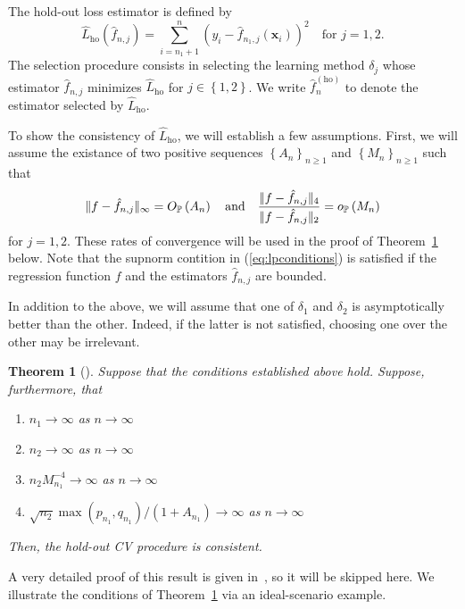 \documentclass[11pt, letter paper]{article}
\newcommand{\1}{\mathmybb{1}}
\newtheorem{theorem}[proposition]{Theorem}
\newcommand{\0}{\emptyset}
\newcommand{\prob}{\mathbb{P}}
\newcommand{\paren}[1]{\left(#1 \right)}
\newcommand{\set}[1]{\left\{ #1 \right\}}
\newcommand{\norm}[1]{|\hspace{-1pt}|#1 |\hspace{-1pt}|}
\newcommand{\x}{\boldsymbol{x}}
\newcommand{\ho}{\hat{L}_{\mathrm{ho}}}
\newcommand{\op}[1]{o_{\prob}\paren{#1}}
\newcommand{\Op}[1]{O_{\prob}\paren{#1}}
\newcommand{\fhat}[2]{\hat{f}_{#1, #2}}
\newcommand{\fho}{\hat{f}^{(\mathrm{ho})}_{n}}
\begin{document}
The hold-out loss estimator is defined by
\begin{equation}\label{def:holoss}
    \ho(\fhat{n}{j}) = \sum_{i=n_{1}+1}^{n}\paren{y_{i} - \fhat{n_{1}}{j}(\x_{i})}^{2}\quad\text{for }j=1,2.
\end{equation}
The selection procedure consists in selecting the learning method \(\delta_{j}\) whose estimator \(\fhat{n}{j}\) minimizes \(\ho\) for \(j\in\set{1,2}\). We write \(\fho\) to denote the estimator selected by \(\ho\).

To show the consistency of \(\ho\), we will establish a few assumptions. First, we will assume the existance of two positive sequences \(\set{A_{n}}_{n\geq1}\) and \(\set{M_{n}}_{n\geq1}\) such that 
\begin{equation}\label{eq:lpconditions}
\norm{f-\fhat{n}{j}}_{\infty} = \Op{A_{n}}\quad\text{and}\quad\frac{\norm{f-\fhat{n}{j}}_{4}}{\norm{f-\fhat{n}{j}}_{2}} = \op{M_{n}}
\end{equation}
for \(j=1,2\). These rates of convergence will be used in the proof of Theorem~\ref{thm:yangth1} below. Note that the supnorm contition in (\ref{eq:lpconditions}) is satisfied if the regression function \(f\) and the estimators \(\fhat{n}{j}\) are bounded.

In addition to the above, we will assume that one of \(\delta_{1}\) and \(\delta_{2}\) is asymptotically better than the other. Indeed, if the latter is not satisfied, choosing one over the other may be irrelevant.

\begin{theorem}[\cite{yang_2007}]\label{thm:yangth1}
    Suppose that the conditions established above hold. Suppose, furthermore, that
    \begin{enumerate}
        \item \(n_{1}\to\infty\) as \(n\to\infty\)
        \item \(n_{2}\to\infty\) as \(n\to\infty\)
        \item \(n_{2}M_{n_{1}}^{-4} \to \infty\) as \(n\to\infty\)
        \item \(\sqrt{n_{2}}\max(p_{n_{1}}, q_{n_{1}})/\paren{1+A_{n_{1}}}\to\infty \) as \(n\to\infty\)
    \end{enumerate}
    Then, the hold-out CV procedure is consistent.
\end{theorem}

A very detailed proof of this result is given in~\textcite{yang_2007}, so it will be skipped here. We illustrate the conditions of Theorem~\ref{thm:yangth1} via an ideal-scenario example.
\end{document}
